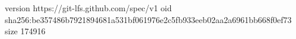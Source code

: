version https://git-lfs.github.com/spec/v1
oid sha256:be357486b7921894681a531bf061976e2c5fb933eeb02aa2a6961bb668f0ef73
size 174916
